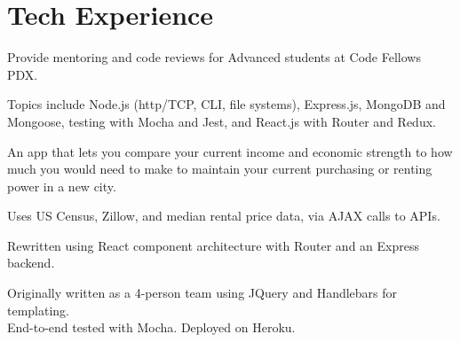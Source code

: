 \documentclass[]{deedy-resume-openfont}
\begin{document}
\begin{minipage}[t]{0.71\textwidth}


\vspace{3mm}
\section{Tech Experience}

\vspace{0.6mm}
Provide mentoring and code reviews for Advanced students at Code Fellows PDX.
\vspace{4.5mm} %
\begin{tightemize}
\item Topics include Node.js (http/TCP, CLI, file systems), Express.js, MongoDB and 
Mongoose, testing with Mocha and Jest, and React.js with Router and Redux. \\
\end{tightemize}
\sectionsep
\vspace{2mm}

\vspace{0.6mm}
An app that lets you compare your current income and economic strength to how much you
would need to make to maintain your current purchasing or renting power in a new city.
\vspace{1.5mm}
\begin{tightemize}
\item Uses US Census, Zillow, and median rental price data, via AJAX calls to APIs.
\item Rewritten using React component architecture with Router and an Express backend.
\item Originally written as a 4-person team using JQuery and Handlebars for templating. \\
End-to-end tested with Mocha. Deployed on Heroku.\\
\end{tightemize}
\sectionsep
\vspace{2mm}


\end{minipage}
\end{document}
